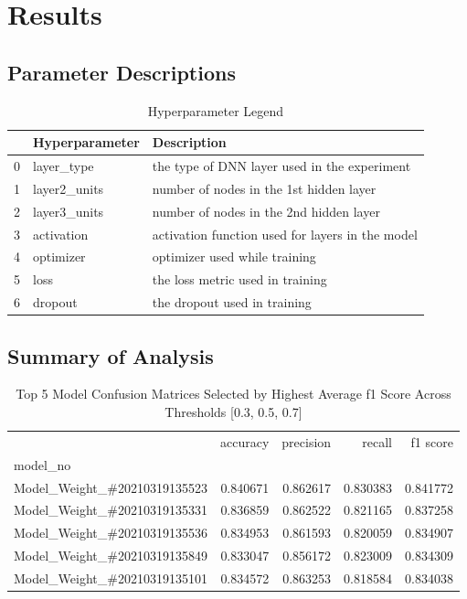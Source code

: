 \section{Results}
\subsection{Parameter Descriptions}
\begin{table}
\centering
\caption{Hyperparameter Legend}
\label{tab:hyplegend}
\begin{tabular}{lll}
\toprule
{} & Hyperparameter &                                       Description \\
\midrule
0 &     layer\_type &      the type of DNN layer used in the experiment \\
1 &   layer2\_units &           number of nodes in the 1st hidden layer \\
2 &   layer3\_units &           number of nodes in the 2nd hidden layer \\
3 &     activation &  activation function used for layers in the model \\
4 &      optimizer &                     optimizer used while training \\
5 &           loss &                  the loss metric used in training \\
6 &        dropout &                      the dropout used in training \\
\bottomrule
\end{tabular}
\end{table}
\subsection{Summary of Analysis}
\begin{table}
\centering
\caption{Top 5 Model Confusion Matrices Selected by Highest Average f1 Score Across Thresholds [0.3, 0.5, 0.7]}
\label{tab:summary_confmatrix}
\begin{tabular}{lrrrr}
\toprule
{} &  accuracy &  precision &    recall &  f1 score \\
model\_no                     &           &            &           &           \\
\midrule
Model\_Weight\_\#20210319135523 &  0.840671 &   0.862617 &  0.830383 &  0.841772 \\
Model\_Weight\_\#20210319135331 &  0.836859 &   0.862522 &  0.821165 &  0.837258 \\
Model\_Weight\_\#20210319135536 &  0.834953 &   0.861593 &  0.820059 &  0.834907 \\
Model\_Weight\_\#20210319135849 &  0.833047 &   0.856172 &  0.823009 &  0.834309 \\
Model\_Weight\_\#20210319135101 &  0.834572 &   0.863253 &  0.818584 &  0.834038 \\
\bottomrule
\end{tabular}
\end{table}
